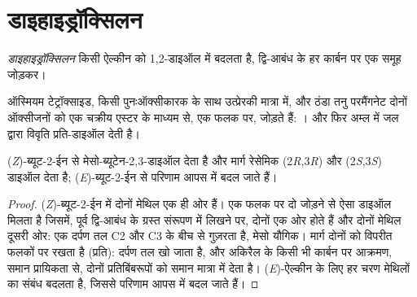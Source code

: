 \section{डाइहाइड्रॉक्सिलन}

\begin{definition}[डाइहाइड्रॉक्सिलन]\label{def:b2:alkene-redox:dihydroxylation}
\emph{डाइहाइड्रॉक्सिलन} किसी ऐल्कीन को 1,2-डाइऑल में बदलता है,
द्वि-आबंध के हर कार्बन पर एक  समूह जोड़कर।
\end{definition}

ऑस्मियम टेट्रॉक्साइड, किसी पुनःऑक्सीकारक के साथ उत्प्रेरकी मात्रा में, और ठंडा तनु परमैंगनेट
दोनों ऑक्सीजनों को एक चक्रीय एस्टर के माध्यम से, एक फलक पर, जोड़ते हैं: ।
 और फिर अम्ल में जल द्वारा विवृति प्रति-डाइऑल देती है।

\begin{proposition}[सम और प्रति डाइऑल]\label{prop:b2:alkene-redox:diols}
(\textit{Z})-ब्यूट-2-ईन से  मेसो-ब्यूटेन-2,3-डाइऑल देता है और 
मार्ग रेसेमिक (2\textit{R},3\textit{R}) और (2\textit{S},3\textit{S}) डाइऑल देता है;
(\textit{E})-ब्यूट-2-ईन से परिणाम आपस में बदल जाते हैं।
\end{proposition}

\begin{proof}
(\textit{Z})-ब्यूट-2-ईन में दोनों मेथिल एक ही ओर हैं। एक फलक पर दो  जोड़ने से
ऐसा डाइऑल मिलता है जिसमें, पूर्व द्वि-आबंध के ग्रस्त संरूपण में लिखने पर,
दोनों  एक ओर होते हैं और दोनों मेथिल दूसरी ओर: एक दर्पण तल
C2 और C3 के बीच से गुज़रता है, मेसो यौगिक।  मार्ग दोनों  को विपरीत फलकों पर रखता है
(प्रति): दर्पण तल खो जाता है, और अकिरैल  के किसी भी कार्बन पर आक्रमण,
समान प्रायिकता से, दोनों प्रतिबिंबरूपों को समान मात्रा में देता है। (\textit{E})-ऐल्कीन के लिए हर
चरण मेथिलों का संबंध बदलता है, जिससे परिणाम आपस में बदल जाते हैं।
\end{proof}

